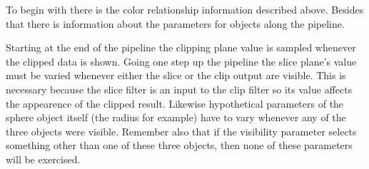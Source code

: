To begin with there is the color relationship information described above. Besides that there is information about the parameters for objects along the pipeline.

Starting at the end of the pipeline the clipping plane value is sampled whenever the clipped data is shown. Going one step up the pipeline the slice plane's value must be varied whenever either the slice or the clip output are visible. This is necessary because the slice filter is an input to the clip filter so its value affects the appearence of the clipped result. Likewise hypothetical parameters of the sphere object itself (the radius for example) have to vary whenever any of the three objects were visible. Remember also that if the visibility parameter selects something other than one of these three objects, then none of these parameters will be exercised.

